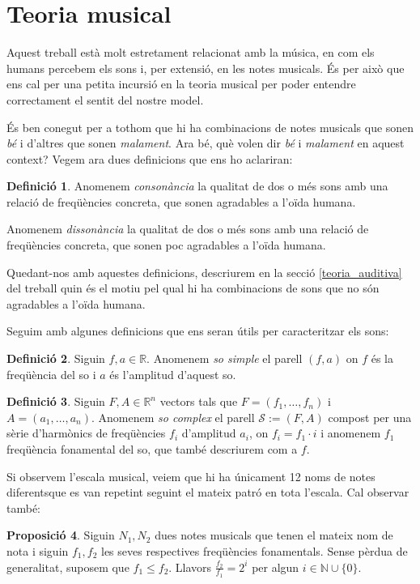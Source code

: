 \documentclass{article}
\theoremstyle{definition}
\newtheorem{definition}{Definició}[section]
\newtheorem{prop}[definition]{Proposició}
\newcommand{\0}{\ensuremath{\vb{0}}}
\begin{document}
\section{Teoria musical}
Aquest treball està molt estretament relacionat amb la música, en com els humans percebem els sons i, per extensió, en les notes musicals. És per això que ens cal per una petita incursió en la teoria musical per poder entendre correctament el sentit del nostre model.\par
És ben conegut per a tothom que hi ha combinacions de notes musicals que sonen \textit{bé} i d'altres que sonen \textit{malament}. Ara bé, què volen dir \textit{bé} i \textit{malament} en aquest context? Vegem ara dues definicions que ens ho aclariran:
\begin{definition}
Anomenem \textit{consonància} la qualitat de dos o més sons amb una relació de freqüències concreta, que sonen agradables a l'oïda humana.\par
Anomenem \textit{dissonància} la qualitat de dos o més sons amb una relació de freqüències concreta, que sonen poc agradables a l'oïda humana.
\end{definition}
Quedant-nos amb aquestes definicions, descriurem en la secció \ref{teoria_auditiva} del treball quin és el motiu pel qual hi ha combinacions de sons que no són agradables a l'oïda humana.\par
Seguim amb algunes definicions que ens seran útils per caracteritzar els sons:
\begin{definition}
Siguin $f, a \in \mathbb{R}$. Anomenem \textit{so simple} el parell $(f, a)$ on $f$ és la freqüència del so i $a$ és l'amplitud d'aquest so.
\end{definition}
\begin{definition}
Siguin $F, A\in\mathbb{R}^n$ vectors tals que $F=(f_1,\ldots, f_n)$ i $A=(a_1,\ldots, a_n)$. Anomenem \textit{so complex} el parell $\mathcal{S}:=(F, A)$ compost per una sèrie d'harmònics de freqüències $f_i$ d'amplitud $a_i$, on $f_i = f_1 \cdot i$ i anomenem $f_1$ freqüència fonamental del so, que també descriurem com a $f$.
\end{definition}
Si observem l'escala musical, veiem que hi ha únicament 12 noms de notes diferents\footnotemark\space que es van repetint seguint el mateix patró en tota l'escala. Cal observar també:
\begin{prop}
  Siguin $N_1, N_2$ dues notes musicals que tenen el mateix nom de nota i siguin $f_1, f_2$ les seves respectives freqüències fonamentals. Sense pèrdua de generalitat, suposem que $f_1 \leq f_2$. Llavors $\frac{f_{2}}{f_{1}} = 2^i$ per algun $i \in \mathbb{N}\cup\{0\}$.
\end{prop}
\end{document}
